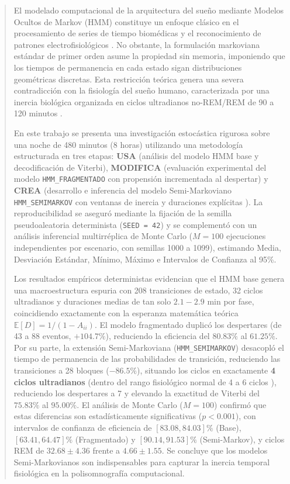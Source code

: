 \documentclass[11pt,a4paper]{article}
\begin{document}
\tableofcontents
\newpage

\begin{abstract}
\noindent El modelado computacional de la arquitectura del sueño mediante Modelos Ocultos de Markov (HMM) constituye un enfoque clásico en el procesamiento de series de tiempo biomédicas y el reconocimiento de patrones electrofisiológicos \cite{rabiner1989}. No obstante, la formulación markoviana estándar de primer orden asume la propiedad sin memoria, imponiendo que los tiempos de permanencia en cada estado sigan distribuciones geométricas discretas. Esta restricción teórica genera una severa contradicción con la fisiología del sueño humano, caracterizada por una inercia biológica organizada en ciclos ultradianos no-REM/REM de 90 a 120 minutos \cite{borbely1982, carska2011, iberaasm2007, aasm2020}.

En este trabajo se presenta una investigación estocástica rigurosa sobre una noche de 480 minutos (8 horas) utilizando una metodología estructurada en tres etapas: \textbf{USA} (análisis del modelo HMM base y decodificación de Viterbi), \textbf{MODIFICA} (evaluación experimental del modelo \texttt{HMM\_FRAGMENTADO} con propensión incrementada al despertar) y \textbf{CREA} (desarrollo e inferencia del modelo Semi-Markoviano \texttt{HMM\_SEMIMARKOV} con ventanas de inercia y duraciones explícitas \cite{ferguson1980, yu2010}). La reproducibilidad se aseguró mediante la fijación de la semilla pseudoaleatoria determinista (\texttt{SEED = 42}) y se complementó con un análisis inferencial multirréplica de Monte Carlo ($M = 100$ ejecuciones independientes por escenario, con semillas 1000 a 1099), estimando Media, Desviación Estándar, Mínimo, Máximo e Intervalos de Confianza al 95\%.

Los resultados empíricos deterministas evidencian que el HMM base genera una macroestructura espuria con 208 transiciones de estado, 32 ciclos ultradianos y duraciones medias de tan solo $2.1 - 2.9\text{ min}$ por fase, coincidiendo exactamente con la esperanza matemática teórica $\mathbb{E}[D] = 1/(1 - A_{ii})$. El modelo fragmentado duplicó los despertares (de 43 a 88 eventos, $+104.7\%$), reduciendo la eficiencia del $80.83\%$ al $61.25\%$. Por su parte, la extensión Semi-Markoviana (\texttt{HMM\_SEMIMARKOV}) desacopló el tiempo de permanencia de las probabilidades de transición, reduciendo las transiciones a 28 bloques ($-86.5\%$), situando los ciclos en exactamente \textbf{4 ciclos ultradianos} (dentro del rango fisiológico normal de 4 a 6 ciclos \cite{carska2011, aasm2020}), reduciendo los despertares a 7 y elevando la exactitud de Viterbi del $75.83\%$ al \textbf{$95.00\%$}. El análisis de Monte Carlo ($M=100$) confirmó que estas diferencias son estadísticamente significativas ($p < 0.001$), con intervalos de confianza de eficiencia de $[83.08, 84.03]\%$ (Base), $[63.41, 64.47]\%$ (Fragmentado) y $[90.14, 91.53]\%$ (Semi-Markov), y ciclos REM de $32.68 \pm 4.36$ frente a $4.66 \pm 1.55$. Se concluye que los modelos Semi-Markovianos son indispensables para capturar la inercia temporal fisiológica en la polisomnografía computacional.
\end{abstract}
\end{document}
